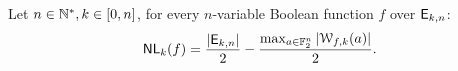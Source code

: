 \documentclass[11pt]{llncs}
\begin{document}
\begin{Prop}\label{prop:nlk}
	Let $n\in \mathbb{N}^*, k\in [0,n]$, for every $n$-variable Boolean function $f$ over $\mathsf{E}_{k,n}$:
	\[ \mathsf{NL}_{k}(f)=\frac{|\mathsf{E}_{k,n}|}{2} -\frac{\max_{a\in \mathbb{F}_2^n} |\mathcal{W}_{f,k}(a)|}{2}  .\]
\end{Prop}







\end{document}
